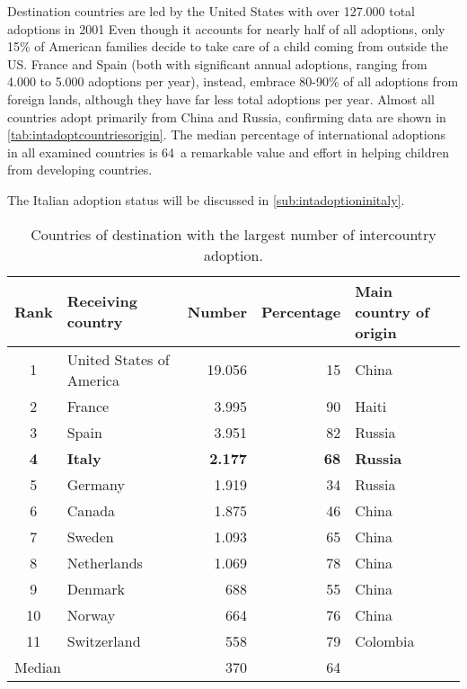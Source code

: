 Destination countries are led by the United States with over 127.000 total adoptions in 2001 Even though it accounts for nearly half of all adoptions, only 15\% of American families decide to take care of a child coming from outside the US. France and Spain (both with significant annual adoptions, ranging from 4.000 to 5.000 adoptions per year), instead, embrace 80-90\% of all adoptions from foreign lands, although they have far less total adoptions per year. Almost all countries adopt primarily from China and Russia, confirming data are shown in \ref{tab:intadoptcountriesorigin}. The median percentage of international adoptions in all examined countries is 64\, a remarkable value and effort in helping children from developing countries.

The Italian adoption status will be discussed in \ref{sub:intadoptioninitaly}.

\begin{table}[H]
   \centering
   \begin{tabular}{c l r r l}
      Rank & Receiving country\footnotemark[1] & Number & Percentage & Main country of origin\\
      \hline
      1 & United States of America & 19.056 & 15 & China\\
      2 & France & 3.995 & 90 & Haiti\\
      3 & Spain & 3.951 & 82 & Russia\\
      \textcolor{BrickRed}{\textbf{4}} & \textcolor{BrickRed}{\textbf{Italy}} & \textcolor{BrickRed}{\textbf{2.177}} & \textcolor{BrickRed}{\textbf{68}} & \textcolor{BrickRed}{\textbf{Russia}}\\
      5 & Germany & 1.919 & 34 & Russia\\
      6 & Canada & 1.875 & 46 & China\\
      7 & Sweden & 1.093 & 65 & China\\
      8 & Netherlands & 1.069 & 78 & China\\
      9 & Denmark & 688 & 55 & China\\
      10 & Norway & 664 & 76 & China\\
      11 & Switzerland & 558 & 79 & Colombia\\
      \hline
      \multicolumn{2}{l}{Median} & 370 & 64 &\\
   \end{tabular}
   \caption{Countries of destination with the largest number of intercountry adoption.}
    \label{tab:intadoptcountriesdestination}
\end{table}


